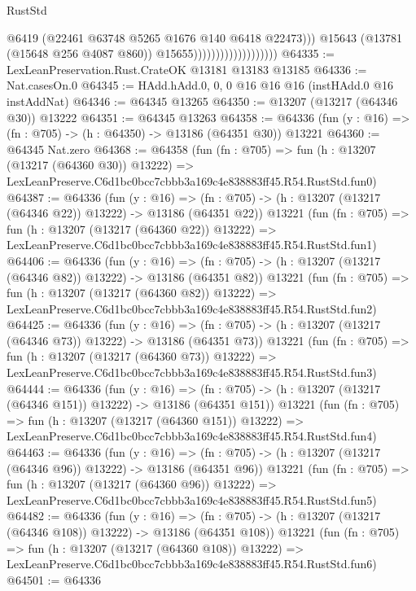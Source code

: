 \begin{lexlean}{RustStd}
\begin{coremodule}
                                              @6419
                                              (@22461 @63748 @5265 @1676 @140 @6418 @22473)))
                                          @15643
                                          (@13781 (@15648 @256 @4087 @860))
                                          @15655)))))))))))))))))))
@64335 := LexLeanPreservation.Rust.CrateOK @13181 @13183 @13185
@64336 := Nat.casesOn.{0}
@64345 := HAdd.hAdd.{0, 0, 0} @16 @16 @16 (instHAdd.{0} @16 instAddNat)
@64346 := @64345 @13265
@64350 := @13207 (@13217 (@64346 @30)) @13222
@64351 := @64345 @13263
@64358 := @64336 (fun (y : @16) => (fn : @705) -> (h : @64350) -> @13186 (@64351 @30)) @13221
@64360 := @64345 Nat.zero
@64368 := @64358
    (fun (fn : @705) =>
    fun (h : @13207 (@13217 (@64360 @30)) @13222) =>
    LexLeanPreserve.C6d1bc0bcc7cbbb3a169c4e838883ff45.R54.RustStd.fun0)
@64387 := @64336
    (fun (y : @16) =>
    (fn : @705) -> (h : @13207 (@13217 (@64346 @22)) @13222) -> @13186 (@64351 @22))
    @13221
    (fun (fn : @705) =>
    fun (h : @13207 (@13217 (@64360 @22)) @13222) =>
    LexLeanPreserve.C6d1bc0bcc7cbbb3a169c4e838883ff45.R54.RustStd.fun1)
@64406 := @64336
    (fun (y : @16) =>
    (fn : @705) -> (h : @13207 (@13217 (@64346 @82)) @13222) -> @13186 (@64351 @82))
    @13221
    (fun (fn : @705) =>
    fun (h : @13207 (@13217 (@64360 @82)) @13222) =>
    LexLeanPreserve.C6d1bc0bcc7cbbb3a169c4e838883ff45.R54.RustStd.fun2)
@64425 := @64336
    (fun (y : @16) =>
    (fn : @705) -> (h : @13207 (@13217 (@64346 @73)) @13222) -> @13186 (@64351 @73))
    @13221
    (fun (fn : @705) =>
    fun (h : @13207 (@13217 (@64360 @73)) @13222) =>
    LexLeanPreserve.C6d1bc0bcc7cbbb3a169c4e838883ff45.R54.RustStd.fun3)
@64444 := @64336
    (fun (y : @16) =>
    (fn : @705) -> (h : @13207 (@13217 (@64346 @151)) @13222) -> @13186 (@64351 @151))
    @13221
    (fun (fn : @705) =>
    fun (h : @13207 (@13217 (@64360 @151)) @13222) =>
    LexLeanPreserve.C6d1bc0bcc7cbbb3a169c4e838883ff45.R54.RustStd.fun4)
@64463 := @64336
    (fun (y : @16) =>
    (fn : @705) -> (h : @13207 (@13217 (@64346 @96)) @13222) -> @13186 (@64351 @96))
    @13221
    (fun (fn : @705) =>
    fun (h : @13207 (@13217 (@64360 @96)) @13222) =>
    LexLeanPreserve.C6d1bc0bcc7cbbb3a169c4e838883ff45.R54.RustStd.fun5)
@64482 := @64336
    (fun (y : @16) =>
    (fn : @705) -> (h : @13207 (@13217 (@64346 @108)) @13222) -> @13186 (@64351 @108))
    @13221
    (fun (fn : @705) =>
    fun (h : @13207 (@13217 (@64360 @108)) @13222) =>
    LexLeanPreserve.C6d1bc0bcc7cbbb3a169c4e838883ff45.R54.RustStd.fun6)
@64501 := @64336

\end{coremodule}
\end{lexlean}
